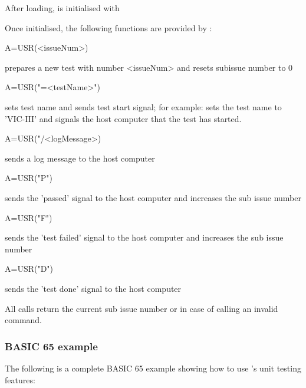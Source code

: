 After loading,  is initialised with


Once initialised, the following functions are provided by :

\begin{screencode}
    A=USR(<issueNum>)
\end{screencode}
prepares a new test with number <issueNum> and resets subissue number to 0

\begin{screencode}
    A=USR("=<testName>")
\end{screencode}
sets test name and sends test start signal; for example:  
sets the test name to 'VIC-III' and signals the host computer that the test 
has started.

\begin{screencode}
    A=USR("/<logMessage>)
\end{screencode}
sends a log message to the host computer

\begin{screencode}
    A=USR("P")
\end{screencode}
sends the 'passed' signal to the host computer and increases the sub issue number

\begin{screencode}
    A=USR("F")
\end{screencode}
sends the 'test failed' signal to the host computer and increases 
the sub issue number

\begin{screencode}
    A=USR("D")
\end{screencode}
sends the 'test done' signal to the host computer 

All calls return the current sub issue number or  in 
case of calling an invalid command.

\subsubsection{BASIC 65 example}

The following is a complete BASIC 65 example showing how to use 's
unit testing features:


